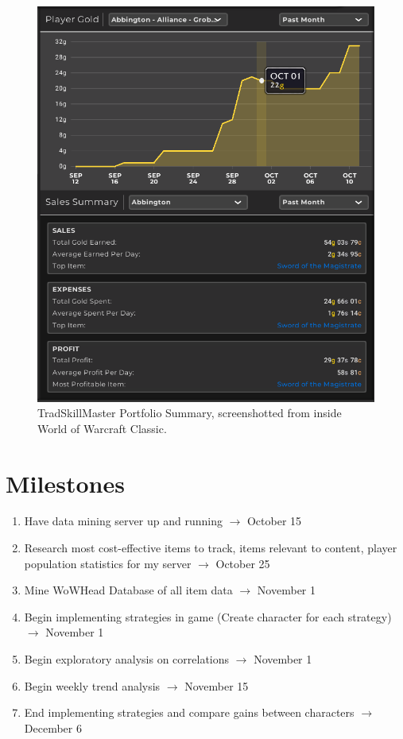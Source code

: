 \documentclass[sigconf]{acmart}
\begin{document}
\begin{figure}[h]
  \centering
  \includegraphics[width=\linewidth]{TSM_Stats}
  \caption{TradSkillMaster Portfolio Summary, screenshotted from inside World of Warcraft Classic.}
\end{figure}

\section{Milestones}
\begin{enumerate}
	\item Have data mining server up and running $\rightarrow$ October 15
	\item Research most cost-effective items to track, items relevant to content, player population statistics for my server $\rightarrow$ October 25
	\item Mine WoWHead Database of all item data $\rightarrow$ November 1
	\item Begin implementing strategies in game (Create character for each strategy) $\rightarrow$ November 1
	\item Begin exploratory analysis on correlations $\rightarrow$ November 1
	\item Begin weekly trend analysis $\rightarrow$ November 15
	\item End implementing strategies and compare gains between characters $\rightarrow$ December 6
\end{enumerate}
\end{document}
